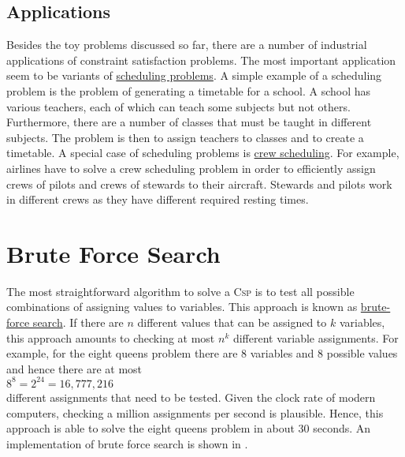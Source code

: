 \subsection{Applications}
Besides the toy problems discussed so far, there are a number of industrial applications of constraint
satisfaction problems.  The most important application seem to be variants of
\href{https://en.wikipedia.org/wiki/Scheduling_(production_processes)}{scheduling problems}. 
A simple example of a scheduling problem is the problem of generating a timetable for a school.  A school has
various teachers, each of which can teach some subjects but not others.  Furthermore, there are a number of
classes that must be taught in different subjects.  The problem is then to assign teachers to classes and to
create a timetable.  A special case of scheduling problems is
\href{https://en.wikipedia.org/wiki/Crew_scheduling}{crew scheduling}.  For example, airlines have to solve a
crew scheduling problem in order to efficiently assign crews of pilots and crews of stewards to their
aircraft.  Stewards and pilots work in different crews as they have different required resting times.

\section{Brute Force Search}
The most straightforward algorithm to solve a \textsc{Csp} is to test all possible combinations of assigning
values to variables.  This approach is known as
\href{https://en.wikipedia.org/wiki/Brute-force_search}{brute-force search}.
If there are $n$ different values that can be assigned to $k$ variables, this approach amounts to 
checking at most $n^k$ different variable assignments.  For example, for the eight queens problem there are 8
variables and 8 possible values and hence there are at most
\\[0.2cm]
\hspace*{1.3cm}
$8^8 = 2^{24} = 16,777,216$
\\[0.2cm]
different assignments that need to be tested.  Given the clock rate of modern computers, checking a million
assignments per second is plausible.  Hence, this approach is able to solve the eight queens problem in
about 30 seconds.  An implementation of brute force search is shown in . 

